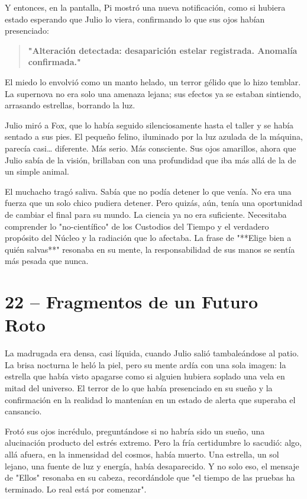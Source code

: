 \documentclass[a4paper,12pt]{book}
\begin{document}
Y entonces, en la pantalla, Pi mostró una nueva notificación, como si hubiera estado esperando que Julio lo viera, confirmando lo que sus ojos habían presenciado:

\begin{quote}
    \textbf{"Alteración detectada: desaparición estelar registrada. Anomalía confirmada."}
\end{quote}

El miedo lo envolvió como un manto helado, un terror gélido que lo hizo temblar. La supernova no era solo una amenaza lejana; sus efectos ya se estaban sintiendo, arrasando estrellas, borrando la luz.

Julio miró a Fox, que lo había seguido silenciosamente hasta el taller y se había sentado a sus pies. El pequeño felino, iluminado por la luz azulada de la máquina, parecía casi… diferente. Más serio. Más consciente. Sus ojos amarillos, ahora que Julio sabía de la visión, brillaban con una profundidad que iba más allá de la de un simple animal.

El muchacho tragó saliva. Sabía que no podía detener lo que venía. No era una fuerza que un solo chico pudiera detener. Pero quizás, aún, tenía una oportunidad de cambiar el final para su mundo. La ciencia ya no era suficiente. Necesitaba comprender lo "no-científico" de los Custodios del Tiempo y el verdadero propósito del Núcleo y la radiación que lo afectaba. La frase de "**Elige bien a quién salvas**" resonaba en su mente, la responsabilidad de sus manos se sentía más pesada que nunca.

\cleardoublepage %

\chapter*{22 – Fragmentos de un Futuro Roto}

La madrugada era densa, casi líquida, cuando Julio salió tambaleándose al patio. La brisa nocturna le heló la piel, pero su mente ardía con una sola imagen: la estrella que había visto apagarse como si alguien hubiera soplado una vela en mitad del universo. El terror de lo que había presenciado en su sueño y la confirmación en la realidad lo mantenían en un estado de alerta que superaba el cansancio.

Frotó sus ojos incrédulo, preguntándose si no habría sido un sueño, una alucinación producto del estrés extremo. Pero la fría certidumbre lo sacudió: algo, allá afuera, en la inmensidad del cosmos, había muerto. Una estrella, un sol lejano, una fuente de luz y energía, había desaparecido. Y no solo eso, el mensaje de "Ellos" resonaba en su cabeza, recordándole que "el tiempo de las pruebas ha terminado. Lo real está por comenzar".
\end{document}
